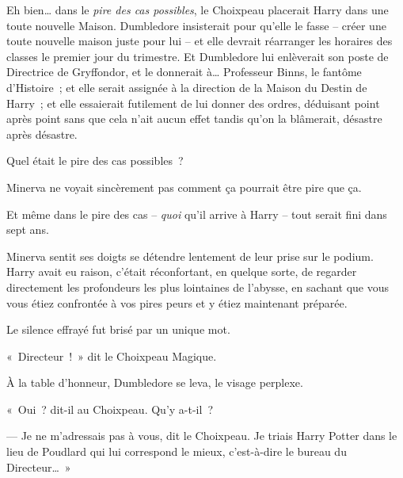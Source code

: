 Eh bien… dans le \emph{pire des cas possibles}, le Choixpeau placerait Harry dans une toute nouvelle Maison. Dumbledore insisterait pour qu'elle le fasse -- créer une toute nouvelle maison juste pour lui -- et elle devrait réarranger les horaires des classes le premier jour du trimestre. Et Dumbledore lui enlèverait son poste de Directrice de Gryffondor, et le donnerait à… Professeur Binns, le fantôme d'Histoire~; et elle serait assignée à la direction de la Maison du Destin de Harry~; et elle essaierait futilement de lui donner des ordres, déduisant point après point sans que cela n'ait aucun effet tandis qu'on la blâmerait, désastre après désastre.

Quel était le pire des cas possibles~?

Minerva ne voyait sincèrement pas comment ça pourrait être pire que ça.

Et même dans le pire des cas -- \emph{quoi} qu'il arrive à Harry -- tout serait fini dans sept ans.

Minerva sentit ses doigts se détendre lentement de leur prise sur le podium. Harry avait eu raison, c'était réconfortant, en quelque sorte, de regarder directement les profondeurs les plus lointaines de l'abysse, en sachant que vous vous étiez confrontée à vos pires peurs et y étiez maintenant préparée.

Le silence effrayé fut brisé par un unique mot.

«~Directeur~!~» dit le Choixpeau Magique.

À la table d'honneur, Dumbledore se leva, le visage perplexe.

«~Oui~? dit-il au Choixpeau. Qu'y a-t-il~?

--- Je ne m'adressais pas à vous, dit le Choixpeau. Je triais Harry Potter dans le lieu de Poudlard qui lui correspond le mieux, c'est-à-dire le bureau du Directeur…~»

